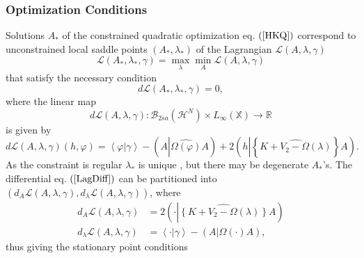 \documentclass[aps,preprint]{revtex4}%
\begin{document}
\subsubsection{Optimization Conditions}

Solutions $A_{\ast}$ of the constrained quadratic optimization eq. $\left(
\ref{HKQ}\right)  $ correspond to unconstrained local saddle points $\left(
A_{\ast},\lambda_{\ast}\right)  $ \cite{KKT} of the Lagrangian $\mathcal{L}%
\left(  A,\lambda,\gamma\right)  $
\begin{equation}
\mathcal{L}\left(  A_{\ast},\lambda_{\ast},\gamma\right)  =\max_{\lambda}%
\min_{A}\mathcal{L}\left(  A,\lambda,\gamma\right)
\end{equation}
that satisfy the necessary condition
\begin{equation}
d\mathcal{L}\left(  A_{\ast},\lambda_{\ast},\gamma\right)  =0,
\end{equation}
where the linear map
\begin{equation}
d\mathcal{L}\left(  A,\lambda,\gamma\right)  :\mathcal{B}_{2sa}\left(
\mathcal{H}^{N}\right)  \times L_{\infty}\left(  \mathbb{X}\right)
\rightarrow\mathbb{R}%
\end{equation}
is given by%
\begin{equation}
d\mathcal{L}\left(  A,\lambda,\gamma\right)  \left(  h,\varphi\right)
=\left\langle \varphi\left\vert \gamma\right.  \right\rangle -\left(
A\left\vert \widehat{\Omega\left(  \varphi\right)  }\right.  A\right)
+2\left(  h\left\vert \left\{  \widehat{K+V_{2}-\Omega\left(  \lambda\right)
}\right\}  \right.  A\right)  . \label{LagDiff}%
\end{equation}
As the constraint is regular $\lambda_{\ast}$ is unique \cite{unique}, but
there may be degenerate $A_{\ast}$'s. The differential eq. $\left(
\ref{LagDiff}\right)  $ can be partitioned into $\left(  d_{A}\mathcal{L}%
\left(  A,\lambda,\gamma\right)  ,d_{\lambda}\mathcal{L}\left(  A,\lambda
,\gamma\right)  \right)  $, where
\begin{align}
d_{A}\mathcal{L}\left(  A,\lambda,\gamma\right)   &  =2\left(  \cdot\left\vert
\widehat{\left\{  K+V_{2}-\Omega\left(  \lambda\right)  \right\}  }\right.
A\right) \nonumber\\
d_{\lambda}\mathcal{L}\left(  A,\lambda,\gamma\right)   &  =\left\langle
\cdot\left\vert \gamma\right.  \right\rangle -\left(  A\left\vert
\Omega\left(  \cdot\right)  \right.  A\right)  ,
\end{align}
thus giving the stationary point conditions
\end{document}
